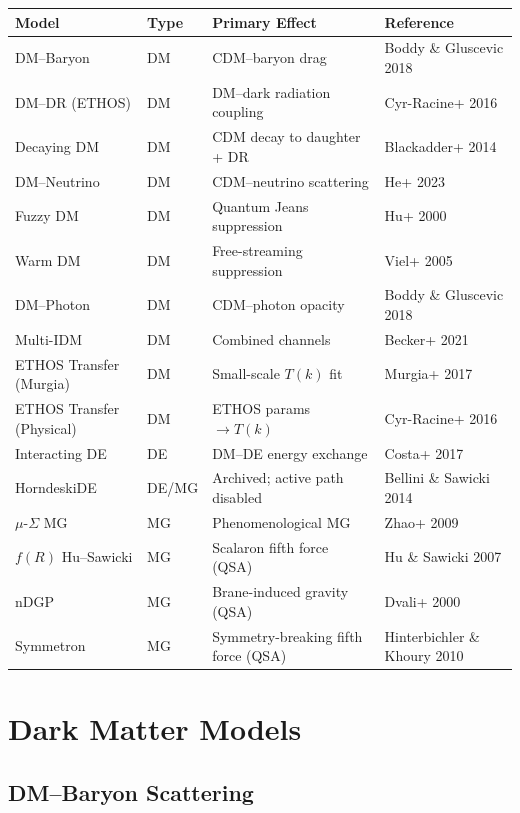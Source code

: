 \documentclass[11pt,a4paper]{article}
\begin{document}
\begin{center}
\small
\begin{tabular}{llll}
\toprule
\textbf{Model} & \textbf{Type} & \textbf{Primary Effect} & \textbf{Reference} \\
\midrule
DM--Baryon & DM & CDM--baryon drag & Boddy \& Gluscevic 2018 \\
DM--DR (ETHOS) & DM & DM--dark radiation coupling & Cyr-Racine+ 2016 \\
Decaying DM & DM & CDM decay to daughter + DR & Blackadder+ 2014 \\
DM--Neutrino & DM & CDM--neutrino scattering & He+ 2023 \\
Fuzzy DM & DM & Quantum Jeans suppression & Hu+ 2000 \\
Warm DM & DM & Free-streaming suppression & Viel+ 2005 \\
DM--Photon & DM & CDM--photon opacity & Boddy \& Gluscevic 2018 \\
Multi-IDM & DM & Combined channels & Becker+ 2021 \\
ETHOS Transfer (Murgia) & DM & Small-scale $T(k)$ fit & Murgia+ 2017 \\
ETHOS Transfer (Physical) & DM & ETHOS params $\to T(k)$ & Cyr-Racine+ 2016 \\
Interacting DE & DE & DM--DE energy exchange & Costa+ 2017 \\
HorndeskiDE & DE/MG & Archived; active path disabled & Bellini \& Sawicki 2014 \\
$\mu$-$\Sigma$ MG & MG & Phenomenological MG & Zhao+ 2009 \\
$f(R)$ Hu--Sawicki & MG & Scalaron fifth force (QSA) & Hu \& Sawicki 2007 \\
nDGP & MG & Brane-induced gravity (QSA) & Dvali+ 2000 \\
Symmetron & MG & Symmetry-breaking fifth force (QSA) & Hinterbichler \& Khoury 2010 \\
\bottomrule
\end{tabular}
\end{center}


\newpage
\section{Dark Matter Models}

\subsection{DM--Baryon Scattering}
\end{document}
